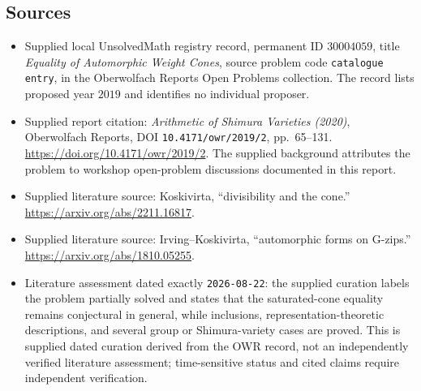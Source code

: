 \documentclass[11pt]{article}
\begin{document}
\subsection{Sources}
\begin{itemize}
\item Supplied local UnsolvedMath registry record, permanent ID $30004059$, title \emph{Equality of Automorphic Weight Cones}, source problem code \texttt{catalogue entry}, in the Oberwolfach Reports Open Problems collection. The record lists proposed year $2019$ and identifies no individual proposer.
\item Supplied report citation: \emph{Arithmetic of Shimura Varieties (2020)}, Oberwolfach Reports, DOI \texttt{10.4171/owr/2019/2}, pp.\ 65--131. \url{https://doi.org/10.4171/owr/2019/2}. The supplied background attributes the problem to workshop open-problem discussions documented in this report.
\item Supplied literature source: Koskivirta, ``divisibility and the cone.'' \url{https://arxiv.org/abs/2211.16817}.
\item Supplied literature source: Irving--Koskivirta, ``automorphic forms on G-zips.'' \url{https://arxiv.org/abs/1810.05255}.
\item Literature assessment dated exactly \texttt{2026-08-22}: the supplied curation labels the problem partially solved and states that the saturated-cone equality remains conjectural in general, while inclusions, representation-theoretic descriptions, and several group or Shimura-variety cases are proved. This is supplied dated curation derived from the OWR record, not an independently verified literature assessment; time-sensitive status and cited claims require independent verification.
\end{itemize}
\end{document}
